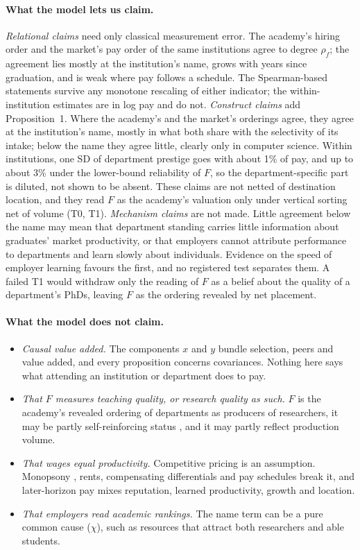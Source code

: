\paragraph{What the model lets us claim.} \emph{Relational claims} need only classical measurement error. The
academy's hiring order and the market's pay order of the same institutions agree to degree $\rho_f$; the
agreement lies mostly at the institution's name, grows with years since graduation, and is weak where pay follows
a schedule. The Spearman-based statements survive any monotone rescaling of either indicator; the
within-institution estimates are in log pay and do not. \emph{Construct claims} add Proposition~1. Where the
academy's and the market's orderings agree, they agree at the institution's name, mostly in what both share with
the selectivity of its intake; below the name they agree little, clearly only in computer science. Within
institutions, one SD of department prestige goes with about 1\% of pay, and up to about 3\% under the lower-bound
reliability of $F$, so the department-specific part is diluted, not shown to be absent. These claims are not
netted of destination location, and they read $F$ as the academy's valuation only under vertical sorting net of
volume (T0, T1). \emph{Mechanism claims} are not made. Little agreement below the name may mean that department
standing carries little information about graduates' market productivity, or that employers cannot attribute
performance to departments and learn slowly about individuals. Evidence on the speed of employer learning
favours the first, and no registered test separates them. A failed T1 would withdraw only the reading of $F$ as
a belief about the quality of a department's PhDs, leaving $F$ as the ordering revealed by net placement.

\paragraph{What the model does not claim.}
\begin{itemize}
\item \emph{Causal value added.} The components $x$ and $y$ bundle selection, peers and value added, and every
proposition concerns covariances. Nothing here says what attending an institution or department does to pay.
\item \emph{That $F$ measures teaching quality, or research quality as such.} $F$ is the academy's revealed
ordering of departments as producers of researchers, it may be partly self-reinforcing status
\citep{burris2004academic}, and it may partly reflect production volume.
\item \emph{That wages equal productivity.} Competitive pricing is an assumption. Monopsony
\citep{staiger2010there}, rents, compensating differentials and pay schedules break it, and later-horizon pay
mixes reputation, learned productivity, growth and location.
\item \emph{That employers read academic rankings.} The name term can be a pure common cause ($\chi$), such as
resources that attract both researchers and able students.
\end{itemize}
